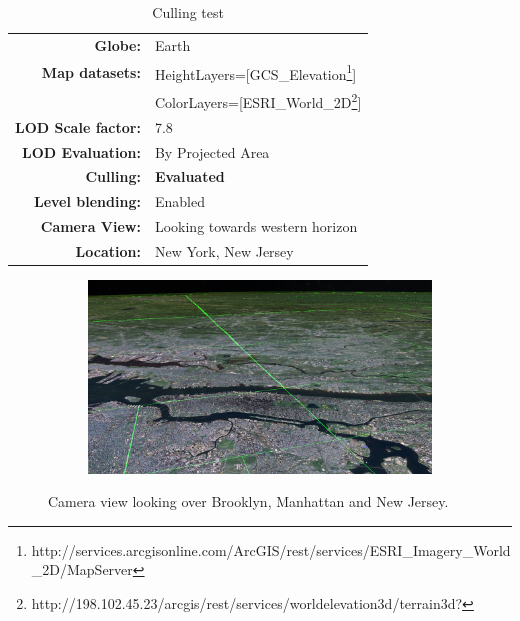 \begin{table}[h]
  \centering
  \caption[]{Culling test}
    \label{table:cullingd}
  \begin{tabular}{| r l |}
    \hline
      \textbf{Globe:}             & Earth \\
      \textbf{Map datasets:}      & HeightLayers=[GCS\_Elevation\footnote{http://services.arcgisonline.com/ArcGIS/rest/services/ESRI\_Imagery\_World\_2D/MapServer}] \\
                                  & ColorLayers=[ESRI\_World\_2D\footnote{http://198.102.45.23/arcgis/rest/services/worldelevation3d/terrain3d?}] \\
      \textbf{LOD Scale factor:}  & 7.8 \\
      \textbf{LOD Evaluation:}    & By Projected Area \\
      \textbf{Culling:}           & \textbf{Evaluated} \\
      \textbf{Level blending:}    & Enabled \\
      \textbf{Camera View:}       & Looking towards western horizon\\
      \textbf{Location:}          & New York, New Jersey\\
    \hline
  \end{tabular}
\end{table}

\begin{figure}[h]
    \centering
    \begin{subfigure}[bt]{1.0\textwidth}
        \includegraphics[width=\textwidth]{figures/results/culling/cam_a.png}
    \end{subfigure}
    \caption{Camera view looking over Brooklyn, Manhattan and New Jersey.}
    \label{fig:cullingacam}
\end{figure}

